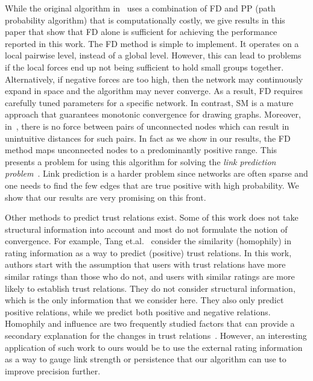 \documentclass[acmtweb]{acmsmall}
\begin{document}
While the original algorithm in~\cite{golbeck:distrust2011} uses a
combination of FD and PP (path probability algorithm) that is
computationally costly, we give results in this paper that show that FD
alone is sufficient for achieving the performance reported in this
work.  The FD method is simple to implement. It operates on a local
pairwise level, instead of a global level. However, this can lead to
problems if the local forces end up not being sufficient to hold small
groups together. Alternatively, if negative forces are too high, then
the network may continuously expand in space and the algorithm may
never converge. As a result, FD requires carefully tuned parameters
for a specific network. In contrast, SM is a mature approach that
guarantees monotonic convergence for drawing graphs. Moreover,
in~\cite{golbeck:distrust2011}, there is no force between pairs of
unconnected nodes which can result in unintuitive distances for such
pairs. In fact as we show in our results, the FD method maps
unconnected nodes to a predominantly positive range. This presents a
problem for using this algorithm for solving the {\it link prediction
  problem}~\cite{Kleinberg:03}. Link prediction is a harder problem
since networks are often sparse and one needs to find the few edges
that are true positive with high probability. We show that our results
are very promising on this front.

Other methods to predict trust relations exist. Some of this work does
not take structural information into account and most do not formulate
the notion of convergence. For example, Tang et.al.~\cite{Tang:2013}
consider the similarity (homophily) in rating information as a way to
predict (positive) trust relations. In this work, authors start with
the assumption that users with trust relations have more similar
ratings than those who do not, and users with similar ratings are more
likely to establish trust relations. They do not consider structural
information, which is the only information that we consider here. They
also only predict positive relations, while we predict both positive
and negative relations. Homophily and influence are two frequently
studied factors that can provide a secondary explanation for the
changes in trust relations~\cite{Aral:2009}. However, an interesting
application of such work to ours would be to use the external rating
information as a way to gauge link strength or persistence that our
algorithm can use to improve precision further.
\end{document}
